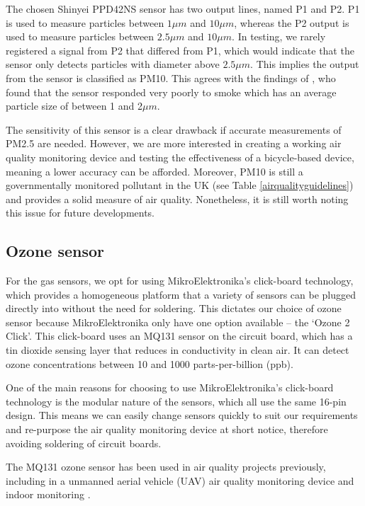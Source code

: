 \documentclass[11pt,twosided,a4paper]{report}
\begin{document}
The chosen Shinyei PPD42NS sensor has two output lines, named P1 and P2. P1 is used to measure particles between $1\mu m$ and $10\mu m$, whereas the P2 output is used to measure particles between $2.5\mu m$ and $10\mu m$. In testing, we rarely registered a signal from P2 that differed from P1, which would indicate that the sensor only detects particles with diameter above $2.5\mu m$. This implies the output from the sensor is classified as PM10. This agrees with the findings of \cite{thorpe2017RPimesh}, who found that the sensor responded very poorly to smoke which has an average particle size of between 1 and 2$\mu m$.

The sensitivity of this sensor is a clear drawback if accurate measurements of PM2.5 are needed. However, we are more interested in creating a working air quality monitoring device and testing the effectiveness of a bicycle-based device, meaning a lower accuracy can be afforded. Moreover, PM10 is still a governmentally monitored pollutant in the UK (see Table \ref{airqualityguidelines}) and provides a solid measure of air quality. Nonetheless, it is still worth noting this issue for future developments.

\subsection{Ozone sensor}

For the gas sensors, we opt for using MikroElektronika's click-board technology, which provides a homogeneous platform that a variety of sensors can be plugged directly into without the need for soldering. This dictates our choice of ozone sensor because MikroElektronika only have one option available -- the `Ozone 2 Click'. This click-board uses an MQ131 sensor on the circuit board, which has a tin dioxide sensing layer that reduces in conductivity in clean air. It can detect ozone concentrations between 10 and 1000 parts-per-billion (ppb).

One of the main reasons for choosing to use MikroElektronika's click-board technology is the modular nature of the sensors, which all use the same 16-pin design. This means we can easily change sensors quickly to suit our requirements and re-purpose the air quality monitoring device at short notice, therefore avoiding soldering of circuit boards.

The MQ131 ozone sensor has been used in air quality projects previously, including in a unmanned aerial vehicle (UAV) air quality monitoring device \citep{alvear2017uav} and indoor monitoring \citep{Abraham2014costeffindoor}.
\end{document}
